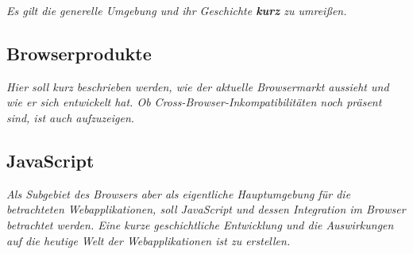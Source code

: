 \textit{Es gilt die generelle Umgebung und ihr Geschichte \textbf{kurz} zu umreißen.}

\subsection{Browserprodukte}
\label{sec:browserprodukte}

\textit{Hier soll kurz beschrieben werden, wie der aktuelle Browsermarkt aussieht und wie er sich entwickelt hat. Ob Cross-Browser-Inkompatibilitäten noch präsent sind, ist auch aufzuzeigen. }

\subsection{JavaScript}

\textit{Als Subgebiet des Browsers aber als eigentliche Hauptumgebung für die betrachteten Webapplikationen, soll JavaScript und dessen Integration im Browser betrachtet werden. Eine kurze geschichtliche Entwicklung und die Auswirkungen auf die heutige Welt der Webapplikationen ist zu erstellen.}
